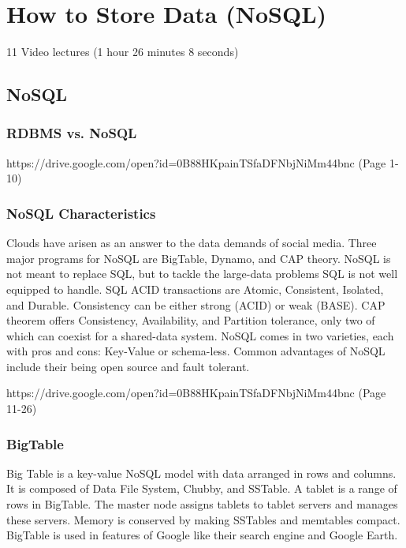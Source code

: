 \part{How to Store Data (NoSQL)}

  11 Video lectures (1 hour 26 minutes 8 seconds)

\chapter{NoSQL}

\section{RDBMS vs. NoSQL}


{https://drive.google.com/open?id=0B88HKpainTSfaDFNbjNiMm44bnc
  (Page 1-10)}

\section{NoSQL Characteristics}

Clouds have arisen as an answer to the data demands of social media.
Three major programs for NoSQL are BigTable, Dynamo, and CAP theory.
NoSQL is not meant to replace SQL, but to tackle the large-data problems
SQL is not well equipped to handle. SQL ACID transactions are Atomic,
Consistent, Isolated, and Durable. Consistency can be either strong
(ACID) or weak (BASE). CAP theorem offers Consistency, Availability, and
Partition tolerance, only two of which can coexist for a shared-data
system. NoSQL comes in two varieties, each with pros and cons: Key-Value
or schema-less. Common advantages of NoSQL include their being open
source and fault tolerant.


{https://drive.google.com/open?id=0B88HKpainTSfaDFNbjNiMm44bnc
  (Page 11-26)}

\section{BigTable}

Big Table is a key-value NoSQL model with data arranged in rows and
columns. It is composed of Data File System, Chubby, and SSTable. A
tablet is a range of rows in BigTable. The master node assigns tablets
to tablet servers and manages these servers. Memory is conserved by
making SSTables and memtables compact. BigTable is used in features of
Google like their search engine and Google Earth.

